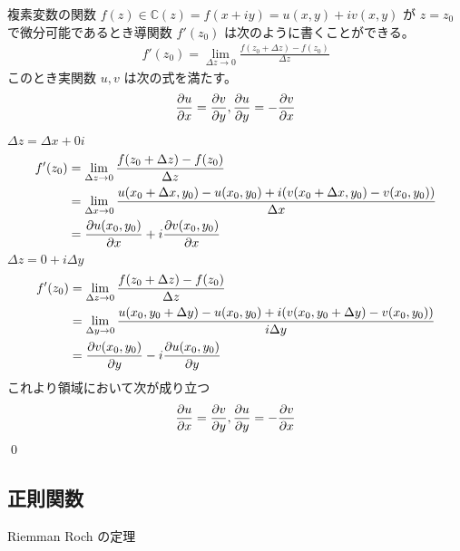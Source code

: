 \documentclass[uplatex,dvipdfmx,a4paper,11pt]{jlreq}
\makeatletter
\newcommand{\CC}{\mathbb{C}}
\theoremstyle{definition}
\renewenvironment{proof}[1][\proofname]{\par
  \normalfont
  \topsep6\p@\@plus6\p@ \trivlist
  \item[\hskip\labelsep{\bfseries #1}\@addpunct{\bfseries}]\ignorespaces\quad\par
}{%
  \qed\endtrivlist\@endpefalse
}
\renewcommand\proofname{証明}
\makeatother
\begin{document}
\begin{theorem}
  複素変数の関数 $f(z)\in\CC(z) = f(x + iy) = u(x, y) + iv(x, y)$ が $z = z_0$ で微分可能であるとき導関数 $f'(z_0)$ は次のように書くことができる。
  \begin{align}
    f'(z_0) = \lim_{\Delta z\to 0}\frac{f(z_0 + \Delta z) - f(z_0)}{\Delta z}
  \end{align}
  このとき実関数 $u, v$ は次の式を満たす。
  \begin{align}
    \pdv{u}{x} = \pdv{v}{y}, \pdv{u}{y} = -\pdv{v}{x}
  \end{align}
\end{theorem}
\begin{proof}
  $\Delta z = \Delta x + 0i$
  \begin{align}
    f'(z_0) & = \lim_{\Delta z\to 0}\frac{f(z_0 + \Delta z) - f(z_0)}{\Delta z}                                                     \\
            & = \lim_{\Delta x\to 0}\frac{u(x_0 + \Delta x, y_0) - u(x_0, y_0) + i(v(x_0 + \Delta x, y_0) - v(x_0, y_0))}{\Delta x} \\
            & = \pdv{u(x_0, y_0)}{x} + i\pdv{v(x_0, y_0)}{x}
  \end{align}
  $\Delta z = 0 + i\Delta y$
  \begin{align}
    f'(z_0) & = \lim_{\Delta z\to 0}\frac{f(z_0 + \Delta z) - f(z_0)}{\Delta z}                                                      \\
            & = \lim_{\Delta y\to 0}\frac{u(x_0, y_0 + \Delta y) - u(x_0, y_0) + i(v(x_0, y_0 + \Delta y) - v(x_0, y_0))}{i\Delta y} \\
            & = \pdv{v(x_0, y_0)}{y} - i\pdv{u(x_0, y_0)}{y}
  \end{align}
  これより領域において次が成り立つ
  \begin{align}
    \pdv{u}{x} = \pdv{v}{y}, \pdv{u}{y} = -\pdv{v}{x}
  \end{align}
\end{proof}


\subsection{正則関数}
\begin{theorem}
  Riemman Roch の定理
\end{theorem}
\end{document}
